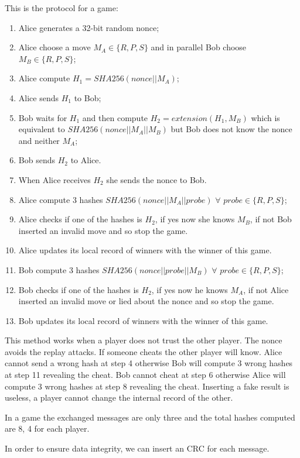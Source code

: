 \documentclass[11pt]{article}
\begin{document}
This is the protocol for a game:
\begin{enumerate}
    \item Alice generates a 32-bit random nonce;
    \item Alice choose a move $M_A \in \{R, P, S\}$ and in parallel Bob choose $M_B \in \{R, P, S\}$;
    \item Alice compute $H_1 = SHA256(nonce || M_A)$;
    \item Alice sends $H_1$ to Bob;
    \item Bob waits for $H_1$ and then compute $H_2 = extension(H_1, M_B)$ which is equivalent to $SHA256(nonce || M_A || M_B)$ but Bob does not know the nonce and neither $M_A$;
    \item Bob sends $H_2$ to Alice.
    \item When Alice receives $H_2$ she sends the nonce to Bob.
    \item Alice compute 3 hashes $SHA256(nonce || M_A || probe)$ $\forall$ $probe \in \{R, P, S\}$;
    \item Alice checks if one of the hashes is $H_2$, if yes now she knows $M_B$, if not Bob inserted an invalid move and so stop the game.
    \item Alice updates its local record of winners with the winner of this game.
    \item Bob compute 3 hashes $SHA256(nonce || probe || M_B)$ $\forall$ $probe \in \{R, P, S\}$;
    \item Bob checks if one of the hashes is $H_2$, if yes now he knows $M_A$, if not Alice inserted an invalid move or lied about the nonce and so stop the game.
    \item Bob updates its local record of winners with the winner of this game.
\end{enumerate}

This method works when a player does not trust the other player. 
The nonce avoids the replay attacks.
If someone cheats the other player will know.
Alice cannot send a wrong hash at step 4 otherwise Bob will compute 3 wrong hashes at step 11 revealing the cheat.
Bob cannot cheat at step 6 otherwise Alice will compute 3 wrong hashes at step 8 revealing the cheat.
Inserting a fake result is useless, a player cannot change the internal record of the other.

In a game the exchanged messages are only three and the total hashes computed are 8, 4 for each player.

In order to ensure data integrity, we can insert an CRC for each message.
\end{document}
